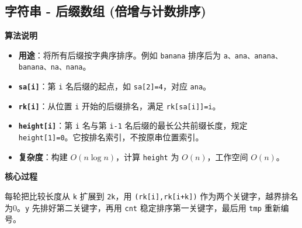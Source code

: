 \documentclass[10pt,landscape,a4paper]{article}
\begin{document}
\begin{multicols*}{3}
\subsection*{字符串 - 后缀数组 (倍增与计数排序)}
\par\addvspace{0.7ex}\noindent\textbf{算法说明}\par\nobreak
\begin{itemize}
\item \textbf{用途}：将所有后缀按字典序排序。例如 \texttt{b\allowbreak{}a\allowbreak{}n\allowbreak{}a\allowbreak{}n\allowbreak{}a} 排序后为 \texttt{a\allowbreak{}、\allowbreak{}a\allowbreak{}n\allowbreak{}a\allowbreak{}、\allowbreak{}a\allowbreak{}n\allowbreak{}a\allowbreak{}n\allowbreak{}a\allowbreak{}、\allowbreak{}b\allowbreak{}a\allowbreak{}n\allowbreak{}a\allowbreak{}n\allowbreak{}a\allowbreak{}、\allowbreak{}n\allowbreak{}a\allowbreak{}、\allowbreak{}n\allowbreak{}a\allowbreak{}n\allowbreak{}a}。
\item \textbf{\texttt{s\allowbreak{}a\allowbreak{}[\allowbreak{}i\allowbreak{}]}}：第 \texttt{i} 名后缀的起点，如 \texttt{s\allowbreak{}a\allowbreak{}[\allowbreak{}2\allowbreak{}]\allowbreak{}=\allowbreak{}4}，对应 \texttt{a\allowbreak{}n\allowbreak{}a}。
\item \textbf{\texttt{r\allowbreak{}k\allowbreak{}[\allowbreak{}i\allowbreak{}]}}：从位置 \texttt{i} 开始的后缀排名，满足 \texttt{r\allowbreak{}k\allowbreak{}[\allowbreak{}s\allowbreak{}a\allowbreak{}[\allowbreak{}i\allowbreak{}]\allowbreak{}]\allowbreak{}=\allowbreak{}i}。
\item \textbf{\texttt{h\allowbreak{}e\allowbreak{}i\allowbreak{}g\allowbreak{}h\allowbreak{}t\allowbreak{}[\allowbreak{}i\allowbreak{}]}}：第 \texttt{i} 名与第 \texttt{i\allowbreak{}-\allowbreak{}1} 名后缀的最长公共前缀长度，规定 \texttt{h\allowbreak{}e\allowbreak{}i\allowbreak{}g\allowbreak{}h\allowbreak{}t\allowbreak{}[\allowbreak{}1\allowbreak{}]\allowbreak{}=\allowbreak{}0}。它按排名索引，不按原串位置索引。
\item \textbf{复杂度}：构建 $O(n\log n)$，计算 \texttt{h\allowbreak{}e\allowbreak{}i\allowbreak{}g\allowbreak{}h\allowbreak{}t} 为 $O(n)$，工作空间 $O(n)$。
\end{itemize}
\par\addvspace{0.7ex}\noindent\textbf{核心过程}\par\nobreak
每轮把比较长度从 \texttt{k} 扩展到 \texttt{2\allowbreak{}k}，用 \texttt{(\allowbreak{}r\allowbreak{}k\allowbreak{}[\allowbreak{}i\allowbreak{}]\allowbreak{},\allowbreak{}r\allowbreak{}k\allowbreak{}[\allowbreak{}i\allowbreak{}+\allowbreak{}k\allowbreak{}]\allowbreak{})} 作为两个关键字，越界排名为0。\texttt{y} 先排好第二关键字，再用 \texttt{c\allowbreak{}n\allowbreak{}t} 稳定排序第一关键字，最后用 \texttt{t\allowbreak{}m\allowbreak{}p} 重新编号。\par

\end{multicols*}
\end{document}
